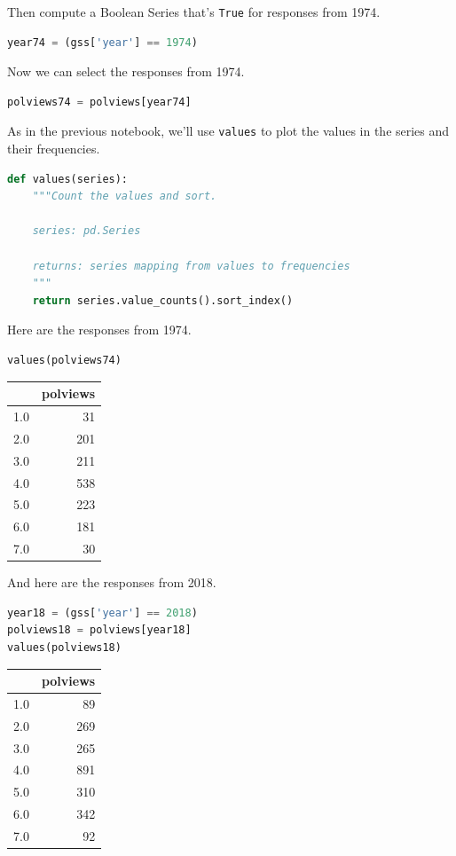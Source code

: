 Then compute a Boolean Series that's \passthrough{\lstinline!True!} for
responses from 1974.

\begin{lstlisting}[language=Python,style=source]
year74 = (gss['year'] == 1974)
\end{lstlisting}

Now we can select the responses from 1974.

\begin{lstlisting}[language=Python,style=source]
polviews74 = polviews[year74]
\end{lstlisting}

As in the previous notebook, we'll use \passthrough{\lstinline!values!}
to plot the values in the series and their frequencies.

\begin{lstlisting}[language=Python,style=source]
def values(series):
    """Count the values and sort.
    
    series: pd.Series
    
    returns: series mapping from values to frequencies
    """
    return series.value_counts().sort_index()
\end{lstlisting}

Here are the responses from 1974.

\begin{lstlisting}[language=Python,style=source]
values(polviews74)
\end{lstlisting}

\begin{tabular}{lr}
\toprule
{} &  polviews \\
\midrule
1.0 &        31 \\
2.0 &       201 \\
3.0 &       211 \\
4.0 &       538 \\
5.0 &       223 \\
6.0 &       181 \\
7.0 &        30 \\
\bottomrule
\end{tabular}

And here are the responses from 2018.

\begin{lstlisting}[language=Python,style=source]
year18 = (gss['year'] == 2018)
polviews18 = polviews[year18]
values(polviews18)
\end{lstlisting}

\begin{tabular}{lr}
\toprule
{} &  polviews \\
\midrule
1.0 &        89 \\
2.0 &       269 \\
3.0 &       265 \\
4.0 &       891 \\
5.0 &       310 \\
6.0 &       342 \\
7.0 &        92 \\
\bottomrule
\end{tabular}

